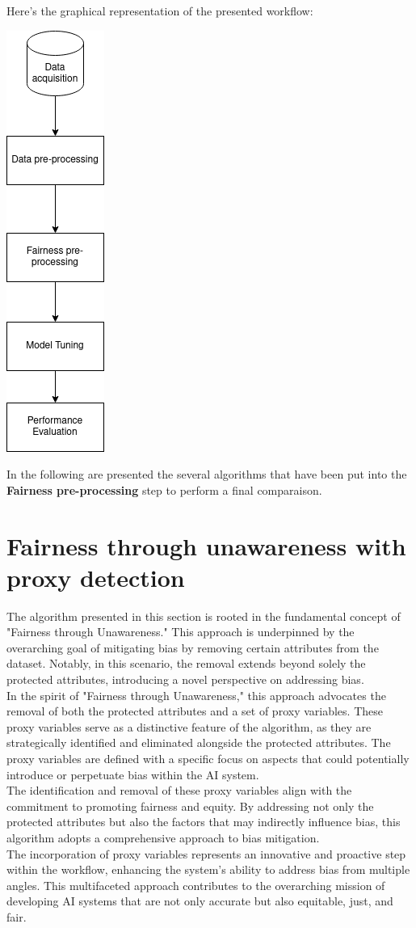 \documentclass[12pt,a4paper,openright,twoside]{book}
\begin{document}
Here's the graphical representation of the presented workflow:
\begin{center}
\includegraphics[width=.4\textwidth, height=0.8\textwidth]{FbD.png}
\end{center}
\newpage
In the following are presented the several algorithms that have been put into the \textbf{Fairness pre-processing} step to perform a final comparaison.
\section{Fairness through unawareness with proxy detection}
The algorithm presented in this section is rooted in the fundamental concept of "Fairness through Unawareness." This approach is underpinned by the overarching goal of mitigating bias by removing certain attributes from the dataset. Notably, in this scenario, the removal extends beyond solely the protected attributes, introducing a novel perspective on addressing bias. \\
In the spirit of "Fairness through Unawareness," this approach advocates the removal of both the protected attributes and a set of proxy variables. These proxy variables serve as a distinctive feature of the algorithm, as they are strategically identified and eliminated alongside the protected attributes. The proxy variables are defined with a specific focus on aspects that could potentially introduce or perpetuate bias within the AI system. \cite{Gupta2018ProxyF}\\
The identification and removal of these proxy variables align with the commitment to promoting fairness and equity. By addressing not only the protected attributes but also the factors that may indirectly influence bias, this algorithm adopts a comprehensive approach to bias mitigation. \\
The incorporation of proxy variables represents an innovative and proactive step within the workflow, enhancing the system's ability to address bias from multiple angles. This multifaceted approach contributes to the overarching mission of developing AI systems that are not only accurate but also equitable, just, and fair.
\end{document}
